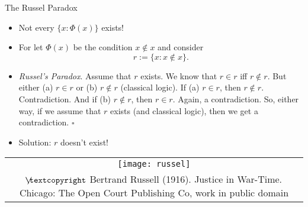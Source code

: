 \documentclass[../slides.tex]{subfiles}
\begin{document}
\begin{frame}{The Russel Paradox}

	\begin{itemize}
	
		\item Not every $\{x: \Phi(x)\}$ exists!
		
		\item For let $\Phi(x)$ be the condition $x\notin x$ and consider \[r:=\{x:x\notin x\}.\] 
		
		\item \emph{Russel's Paradox}. Assume that $r$ exists.  We know that $r\in r$ iff $r\notin r$.  But either (a) $r\in r$ or (b) $r\notin r$ (classical logic).  If (a) $r\in r$, then $r\notin r$.  Contradiction.  And if (b) $r\notin r$, then $r\in r$. Again, a contradiction.  So, either way, if we assume that $r$ exists (and classical logic), then we get a contradiction.  \hfill $\square$ 
		
		\item Solution: $r$ doesn't exist!
	
	\end{itemize}
	
	\begin{center}
		\begin{tabular}{c}
		\texttt{[image: russel]}\\[-1ex]
		{\tiny $\not\hspace{-1ex}\textcopyright$ Bertrand Russell (1916). Justice in War-Time. Chicago: The Open Court Publishing Co, work in public domain}
		\end{tabular}
		\end{center}
	

\end{frame}
\end{document}
